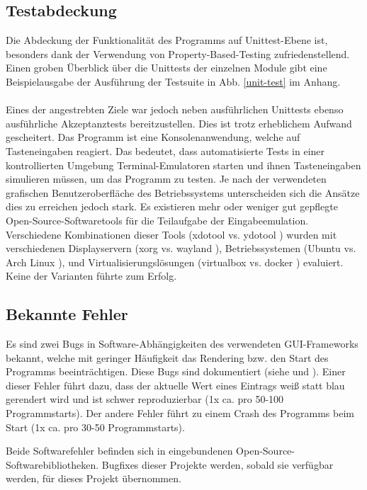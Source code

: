 \subsection{Testabdeckung} \label{Testabdeckung}
Die Abdeckung der Funktionalität des Programms auf Unittest-Ebene ist, besonders
dank der Verwendung von \gls{Property-Based-Testing} \cite{property-based-testing}
zufriedenstellend. Einen groben Überblick über die Unittests der einzelnen Module
gibt eine Beispielausgabe der Ausführung der Testsuite in Abb. \ref{unit-test} im
Anhang.

\paragraph{}
Eines der angestrebten Ziele war jedoch neben ausführlichen Unittests ebenso ausführliche
Akzeptanztests bereitzustellen. Dies ist trotz erheblichem Aufwand gescheitert.
Das Programm ist eine Konsolenanwendung, welche auf Tasteneingaben reagiert. Das
bedeutet, dass automatisierte Tests in einer kontrollierten Umgebung Terminal-Emulatoren
starten und ihnen Tasteneingaben simulieren müssen, um das Programm zu testen. Je nach
der verwendeten grafischen Benutzeroberfläche des Betriebssystems unterscheiden sich
die Ansätze dies zu erreichen jedoch stark. Es existieren mehr oder weniger gut
gepflegte Open-Source-Softwaretools für die Teilaufgabe der Eingabeemulation. Verschiedene
Kombinationen dieser Tools (xdotool \cite{xdotool} vs. ydotool \cite{ydotool}) wurden
mit verschiedenen Displayservern (xorg \cite{xorg} vs. wayland \cite{wayland}),
Betriebssystemen (Ubuntu \cite{ubuntu} vs. Arch Linux \cite{arch}), und
Virtualisierungslösungen (virtualbox \cite{virtualbox} vs. docker \cite{docker})
evaluiert. Keine der Varianten führte zum Erfolg.

\subsection{Bekannte Fehler}
Es sind zwei Bugs in Software-Abhängigkeiten des verwendeten \gls{GUI}-Frameworks
bekannt, welche mit geringer Häufigkeit das \gls{Rendering} bzw. den Start des Programms
beeinträchtigen. Diese Bugs sind dokumentiert (siehe \cite{bug-vty-startup-crash} und
\cite{bug-vty-terminal-capabilities}). Einer dieser Fehler führt dazu, dass der
aktuelle Wert eines Eintrags weiß statt blau gerendert wird und ist schwer
reproduzierbar (1x ca. pro 50-100 Programmstarts). Der andere Fehler führt zu
einem Crash des Programms beim Start (1x ca. pro 30-50 Programmstarts).

Beide Softwarefehler befinden sich in eingebundenen Open-Source-Softwarebibliotheken.
Bugfixes dieser Projekte werden, sobald sie verfügbar werden, für dieses Projekt
übernommen.
